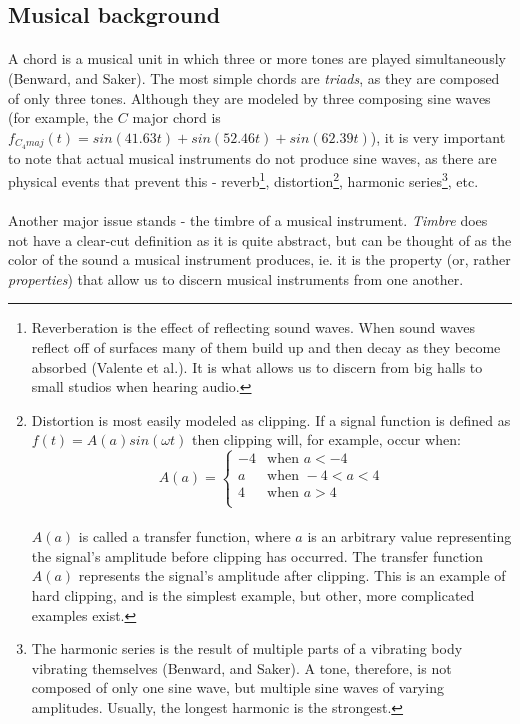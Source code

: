 \documentclass{article}
\begin{document}
\subsection{Musical background}

\paragraph*{}
A chord is a musical unit in which three or more tones are played
simultaneously (Benward, and Saker). The most simple chords are
\textit{triads}, as they are composed of only three tones.  Although they are
modeled by three composing sine waves (for example, the $C$ major chord is
$f_{C_4maj} (t) = sin(41.63t) + sin(52.46t) + sin(62.39t)$), it is very
important to note that actual musical instruments do not produce sine waves, as
there are physical events that prevent this - reverb\footnote{Reverberation is
	the effect of reflecting sound waves. When sound waves reflect off of
	surfaces many of them build up and then decay as they become absorbed
	(Valente et al.). It is what allows us to discern from big halls to small
studios when hearing audio.}, distortion\footnote{Distortion is most easily
	modeled as clipping. If a signal function is defined as $f(t) = A(a)
	sin(\omega t)$ then clipping will, for example, occur when:
$$A(a) = 
\begin{cases}
	-4	& \text{when }a < -4 \\
	a	& \text{when }-4 < a < 4 \\
	4	& \text{when }a > 4 \\
\end{cases}
$$
\paragraph*{}
$A(a)$ is called a transfer function, where $a$ is an arbitrary value
representing the signal's amplitude before clipping has occurred. The transfer
function $A(a)$ represents the signal's amplitude after clipping.
This is an example of hard clipping, and is the simplest example, but other, 
more complicated examples exist.}, harmonic series\footnote{The harmonic 
series is the result of multiple parts of a vibrating body vibrating 
themselves (Benward, and Saker). A tone, therefore, is not composed of only 
one sine wave, but multiple sine waves of varying amplitudes. Usually, the 
longest harmonic is the strongest.}, etc.

\paragraph*{}
Another major issue stands - the timbre of a musical instrument. 
\textit{Timbre} does not have a clear-cut definition as it is quite abstract, 
but can be thought of as the color of the sound a musical instrument produces, 
ie. it is the property (or, rather \textit{properties}) that allow us to 
discern musical instruments from one another.
\end{document}

